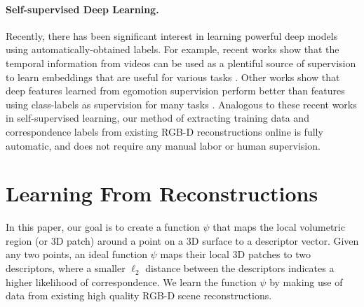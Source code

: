 \documentclass[10pt,twocolumn,letterpaper]{article}
\newcommand{\mypara}{\vspace*{-3mm}\paragraph}
\begin{document}
\mypara{Self-supervised Deep Learning.}
Recently, there has been significant interest in learning powerful deep models using automatically-obtained labels. For example, recent works show that the temporal information from videos can be used as a plentiful source of supervision to learn embeddings that are useful for various tasks \cite{goroshin2015unsupervised,ramanathan2015learning}. Other works show that deep features learned from egomotion supervision perform better than features using class-labels as supervision for many tasks \cite{agrawal2015learning}. Analogous to these recent works in self-supervised learning, our method of extracting training data and correspondence labels from existing RGB-D reconstructions online is fully automatic, and does not require any manual labor or human supervision.



\section{Learning From Reconstructions}
\label{sec:learning-from-reconstructions}
In this paper, our goal is to create a function $\psi$ that maps the local volumetric region (or 3D patch) around a point on a 3D surface to a descriptor vector. Given any two points, an ideal function $\psi$ maps their local 3D patches to two descriptors, where a smaller $\ell_2$ distance between the descriptors indicates a higher likelihood of correspondence.
We learn the function $\psi$ by making use of data from existing high quality RGB-D scene reconstructions. 

\end{document}
